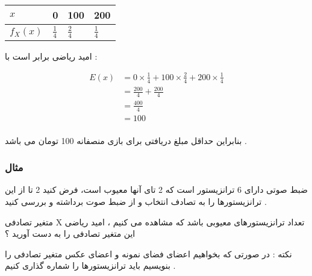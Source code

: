 \documentclass[12pt]{book}
\begin{document}
\begin{center}
\begin{latin}
\begin{tabular}{ l |  l  l  l }
  $x$ & 0 & 100 & 200  \\
  \hline
  $f_{X}(x)$ & $\frac{1}{4}$ & $\frac{2}{4}$ & $\frac{1}{4}$   \\
\end{tabular}
\end{latin}
\end{center}



امید ریاضی برابر است با :

\begin{align*}
E(x) &= 0 \times \frac{1}{4} 
+ 100 \times \frac{2}{4} 
+ 200 \times \frac{1}{4} \\
&= \frac{200}{4} + \frac{200}{4} \\
&= \frac{400}{4} \\
&= 100 \\
\end{align*}

بنابراین حداقل مبلغ دریافتی برای بازی منصفانه 100 تومان می باشد .



\subsubsection{مثال}
ضبط صوتی دارای 6 ترانزیستور است که 2 تای آنها معیوب است، فرض کنید 2 تا از این ترانزیستورها را به تصادف انتخاب و از ضبط صوت برداشته و بررسی کنید . 

متغیر تصادفی X تعداد ترانزیستورهای معیوبی باشد که مشاهده می کنیم ، امید ریاضی این متغیر تصادفی را به دست آورید ؟

نکته : در صورتی که بخواهیم اعضای فضای نمونه و اعضای عکس متغیر تصادفی را بنویسیم باید ترانزیستورها را شماره گذاری کنیم .

\end{document}
